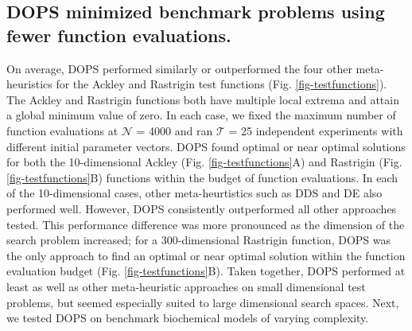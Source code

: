 \documentclass{bmcart}
\begin{document}
\subsection*{DOPS minimized benchmark problems using fewer function evaluations.}
On average, DOPS performed similarly or outperformed the four other meta-heuristics for the Ackley and Rastrigin test functions (Fig. \ref{fig-testfunctions}).
The Ackley and Rastrigin functions both have multiple local extrema and attain a global minimum value of zero.
In each case, we fixed the maximum number of function evaluations at $\mathcal{N}$ = 4000 and ran $\mathcal{T}$ = 25 independent experiments with different initial parameter vectors.
DOPS found optimal or near optimal solutions for both the 10-dimensional Ackley (Fig. \ref{fig-testfunctions}A) and Rastrigin (Fig. \ref{fig-testfunctions}B) functions within the budget of function evaluations.
In each of the 10-dimensional cases, other meta-heurtistics such as DDS and DE also performed well. However, DOPS consistently outperformed all other approaches tested.
This performance difference was more pronounced as the dimension of the search problem increased; for a 300-dimensional Rastrigin function, DOPS was the only approach to find an optimal or near optimal solution
within the function evaluation budget (Fig. \ref{fig-testfunctions}B).
Taken together, DOPS performed at least as well as other meta-heuristic approaches on small dimensional test problems, but seemed especially suited to large dimensional search spaces.
Next, we tested DOPS on benchmark biochemical models of varying complexity.
\end{document}
